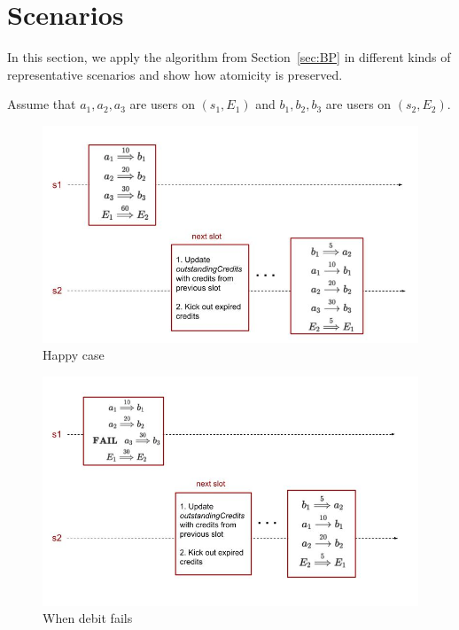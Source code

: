 \documentclass{IEEEtran}
\begin{document}
\section{Scenarios}
In this section, we apply the algorithm from Section~\ref{sec:BP} in different kinds of representative scenarios and show how atomicity is preserved.

Assume that $a_1, a_2, a_3$ are users on $(s_1,E_1)$ and $b_1,b_2,b_3$ are users on $(s_2,E_2)$.

\begin{figure}
	\centering
	\includegraphics[scale=0.4]{OptmisiticCase.jpg}
	\caption{Happy case\label{fig:optimistic}}
\end{figure}

\begin{figure}
	\centering
	\includegraphics[scale=0.4]{Debit.jpg}
	\caption{When debit fails\label{fig:debit}}
\end{figure}
\end{document}

